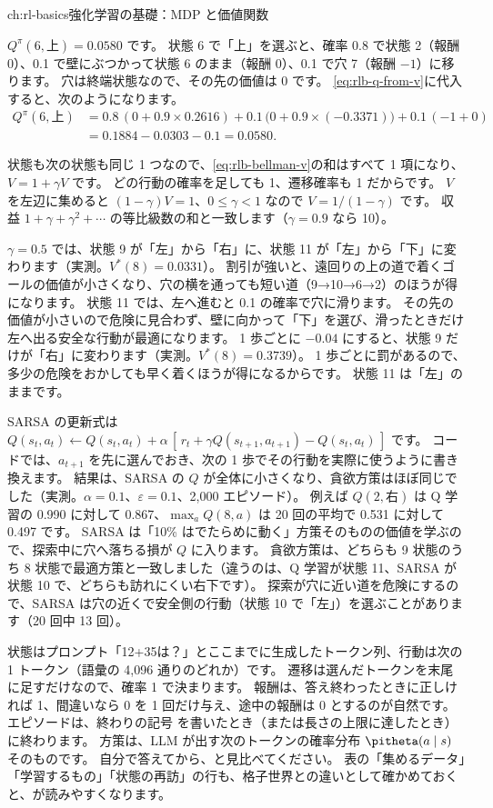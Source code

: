 \begin{answers}{ch:rl-basics}{強化学習の基礎：MDP と価値関数}
\item $Q^\pi(6,\text{上})=0.0580$ です。
状態 6 で「上」を選ぶと、確率 0.8 で状態 2（報酬 0）、0.1 で壁にぶつかって状態 6 のまま（報酬 0）、0.1 で穴 7（報酬 $-1$）に移ります。
穴は終端状態なので、その先の価値は 0 です。
\eqref{eq:rlb-q-from-v}に代入すると、次のようになります。
\begin{align*}
Q^\pi(6,\text{上})&=0.8\,(0+0.9\times0.2616)+0.1\,\bigl(0+0.9\times(-0.3371)\bigr)+0.1\,(-1+0)\\
&=0.1884-0.0303-0.1=0.0580.
\end{align*}
\item 状態も次の状態も同じ 1 つなので、\eqref{eq:rlb-bellman-v}の和はすべて 1 項になり、$V=1+\gamma V$ です。
どの行動の確率を足しても 1、遷移確率も 1 だからです。
$V$ を左辺に集めると $(1-\gamma)V=1$、$0\le\gamma<1$ なので $V=1/(1-\gamma)$ です。
収益 $1+\gamma+\gamma^2+\cdots$ の等比級数の和と一致します（$\gamma=0.9$ なら 10）。
\item $\gamma=0.5$ では、状態 9 が「左」から「右」に、状態 11 が「左」から「下」に変わります（実測。$V^\ast(8)=0.0331$）。
割引が強いと、遠回りの上の道で着くゴールの価値が小さくなり、穴の横を通っても短い道（9→10→6→2）のほうが得になります。
状態 11 では、左へ進むと 0.1 の確率で穴に滑ります。
その先の価値が小さいので危険に見合わず、壁に向かって「下」を選び、滑ったときだけ左へ出る安全な行動が最適になります。
1 歩ごとに $-0.04$ にすると、状態 9 だけが「右」に変わります（実測。$V^\ast(8)=0.3739$）。
1 歩ごとに罰があるので、多少の危険をおかしても早く着くほうが得になるからです。
状態 11 は「左」のままです。
\item SARSA の更新式は $Q(s_t,a_t)\leftarrow Q(s_t,a_t)+\alpha\,[\,r_t+\gamma Q(s_{t+1},a_{t+1})-Q(s_t,a_t)\,]$ です。
コードでは、$a_{t+1}$ を先に選んでおき、次の 1 歩でその行動を実際に使うように書き換えます。
結果は、SARSA の $Q$ が全体に小さくなり、貪欲方策はほぼ同じでした（実測。$\alpha=0.1$、$\varepsilon=0.1$、2,000 エピソード）。
例えば $Q(2,\text{右})$ は Q 学習の 0.990 に対して 0.867、$\max_a Q(8,a)$ は 20 回の平均で 0.531 に対して 0.497 です。
SARSA は「10\% はでたらめに動く」方策そのものの価値を学ぶので、探索中に穴へ落ちる損が $Q$ に入ります。
貪欲方策は、どちらも 9 状態のうち 8 状態で最適方策と一致しました（違うのは、Q 学習が状態 11、SARSA が状態 10 で、どちらも訪れにくい右下です）。
探索が穴に近い道を危険にするので、SARSA は穴の近くで安全側の行動（状態 10 で「左」）を選ぶことがあります（20 回中 13 回）。
\item 状態はプロンプト「12+35は？」とここまでに生成したトークン列、行動は次の 1 トークン（語彙の 4,096 通りのどれか）です。
遷移は選んだトークンを末尾に足すだけなので、確率 1 で決まります。
報酬は、答え終わったときに正しければ 1、間違いなら 0 を 1 回だけ与え、途中の報酬は 0 とするのが自然です。
エピソードは、終わりの記号  を書いたとき（または長さの上限に達したとき）に終わります。
方策は、LLM が出す次のトークンの確率分布 $\pitheta(a\mid s)$ そのものです。
自分で答えてから、と見比べてください。
表の「集めるデータ」「学習するもの」「状態の再訪」の行も、格子世界との違いとして確かめておくと、が読みやすくなります。
\end{answers}
